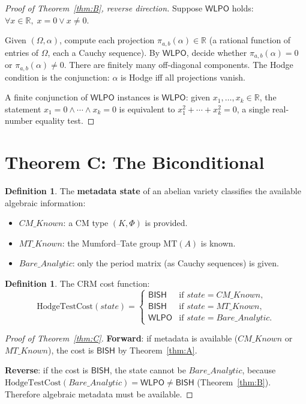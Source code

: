 \documentclass[11pt]{article}
\theoremstyle{plain}
\theoremstyle{definition}
\newtheorem{definition}[theorem]{Definition}
\theoremstyle{remark}
\newcommand{\R}{\mathbb{R}}
\newcommand{\MT}{\mathrm{MT}}
\newcommand{\BISH}{\ensuremath{\mathsf{BISH}}}
\newcommand{\WLPO}{\ensuremath{\mathsf{WLPO}}}
\begin{document}
\begin{proof}[Proof of Theorem~\ref{thm:B}, reverse direction]
Suppose $\WLPO$ holds: $\forall x \in \R, \; x = 0 \lor x \neq 0$.

Given $(\Omega, \alpha)$, compute each projection $\pi_{a,b}(\alpha) \in \R$ (a rational function of entries of $\Omega$, each a Cauchy sequence). By $\WLPO$, decide whether $\pi_{a,b}(\alpha) = 0$ or $\pi_{a,b}(\alpha) \neq 0$. There are finitely many off-diagonal components. The Hodge condition is the conjunction: $\alpha$ is Hodge iff all projections vanish.

A finite conjunction of $\WLPO$ instances is $\WLPO$: given $x_1, \ldots, x_k \in \R$, the statement $x_1 = 0 \land \cdots \land x_k = 0$ is equivalent to $x_1^2 + \cdots + x_k^2 = 0$, a single real-number equality test.
\end{proof}


\section{Theorem C: The Biconditional}\label{sec:thmC}

\begin{definition}\label{def:metadata}
The \textbf{metadata state} of an abelian variety classifies the available algebraic information:
\begin{itemize}
\item $\mathit{CM\_Known}$: a CM type $(K, \Phi)$ is provided.
\item $\mathit{MT\_Known}$: the Mumford--Tate group $\MT(A)$ is known.
\item $\mathit{Bare\_Analytic}$: only the period matrix (as Cauchy sequences) is given.
\end{itemize}
\end{definition}

\begin{definition}\label{def:cost}
The CRM cost function:
\[
\mathrm{HodgeTestCost}(\mathit{state}) = \begin{cases} \BISH & \text{if } \mathit{state} = \mathit{CM\_Known}, \\ \BISH & \text{if } \mathit{state} = \mathit{MT\_Known}, \\ \WLPO & \text{if } \mathit{state} = \mathit{Bare\_Analytic}. \end{cases}
\]
\end{definition}

\begin{proof}[Proof of Theorem~\ref{thm:C}]
\textbf{Forward}: if metadata is available ($\mathit{CM\_Known}$ or $\mathit{MT\_Known}$), the cost is $\BISH$ by Theorem~\ref{thm:A}.

\textbf{Reverse}: if the cost is $\BISH$, the state cannot be $\mathit{Bare\_Analytic}$, because $\mathrm{HodgeTestCost}(\mathit{Bare\_Analytic}) = \WLPO \neq \BISH$ (Theorem~\ref{thm:B}). Therefore algebraic metadata must be available.
\end{proof}
\end{document}

